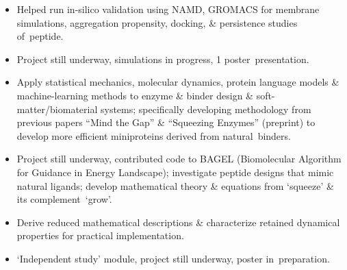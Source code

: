 \begin{itemize}
  \item Helped run in-silico validation using NAMD, GROMACS for membrane simulations, aggregation propensity, docking, \& persistence studies \cvkeep{}of~\cvlast{}peptide.\cvkeepend{}
  \item Project still underway, simulations in progress, 1 \cvkeep{}poster~\cvlast{}presentation.\cvkeepend{}
\end{itemize}
\begin{itemize}
  \item Apply statistical mechanics, molecular dynamics, protein language models \& machine-learning methods to enzyme \& binder design \& soft-matter/biomaterial systems; specifically developing methodology from previous papers ``Mind the Gap'' \& ``Squeezing Enzymes'' (preprint) to develop more efficient miniproteins derived from \cvkeep{}natural~\cvlast{}binders.\cvkeepend{}
  \item Project still underway, contributed code to BAGEL (Biomolecular Algorithm for Guidance in Energy Landscape); investigate peptide designs that mimic natural ligands; develop mathematical theory \& equations from `squeeze' \& its \cvkeep{}complement~\cvlast{}`grow'.\cvkeepend{}
\end{itemize}
\begin{itemize}
  \item Derive reduced mathematical descriptions \& characterize retained dynamical properties for practical \cvkeep{}\cvlast{}implementation.\cvkeepend{}
  \item `Independent study' module, project still underway, poster \cvkeep{}in~\cvlast{}preparation.\cvkeepend{}
\end{itemize}
